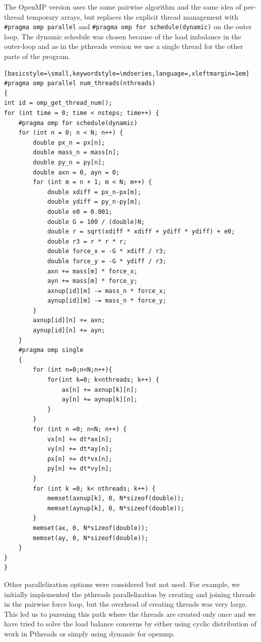 \documentclass[11pt,a4paper]{article}
\begin{document}
The OpenMP version uses the same pairwise algorithm and the same idea of per-thread
temporary arrays, but replaces the explicit thread management with \texttt{\#pragma omp parallel}
and \texttt{\#pragma omp for schedule(dynamic)} on the outer loop. The dynamic schedule was
chosen because of the load imbalance in the outer-loop and as in the pthreads version we use a
single thread for the other parts of the program.

\begin{lstlisting}[basicstyle=\small,keywordstyle=\mdseries,language=,xleftmargin=1em]
#pragma omp parallel num_threads(nthreads)
{
int id = omp_get_thread_num();
for (int time = 0; time < nsteps; time++) {
    #pragma omp for schedule(dynamic)
    for (int n = 0; n < N; n++) {
        double px_n = px[n];
        double mass_n = mass[n];
        double py_n = py[n];
        double axn = 0, ayn = 0;
        for (int m = n + 1; m < N; m++) {
            double xdiff = px_n-px[m];
            double ydiff = py_n-py[m];
            double e0 = 0.001;
            double G = 100 / (double)N;
            double r = sqrt(xdiff * xdiff + ydiff * ydiff) + e0;
            double r3 = r * r * r;
            double force_x = -G * xdiff / r3;
            double force_y = -G * ydiff / r3;
            axn += mass[m] * force_x;
            ayn += mass[m] * force_y;
            axnup[id][m] -= mass_n * force_x;
            aynup[id][m] -= mass_n * force_y;
        }
        axnup[id][n] += axn;
        aynup[id][n] += ayn;
    }
    #pragma omp single
    {
        for (int n=0;n<N;n++){
            for(int k=0; k<nthreads; k++) {
                ax[n] += axnup[k][n];
                ay[n] += aynup[k][n];
            }
        }
        for (int n =0; n<N; n++) {
            vx[n] += dt*ax[n];
            vy[n] += dt*ay[n];
            px[n] += dt*vx[n];
            py[n] += dt*vy[n];
        }
        for (int k =0; k< nthreads; k++) {
            memset(axnup[k], 0, N*sizeof(double));
            memset(aynup[k], 0, N*sizeof(double));
        }
        memset(ax, 0, N*sizeof(double));
        memset(ay, 0, N*sizeof(double));
    }
}
}
\end{lstlisting}

Other parallelization options were considered but not used. For example, we initially implemented the pthreads parallelization by creating and joining threads in the pairwise force loop,
but the overhead of creating threads was very large. This led us to pursuing this path where
the threads are created only once and we have tried to solve the load balance concerns by either
using cyclic distribution of work in Pthreads or simply using dynamic for openmp.
\end{document}
